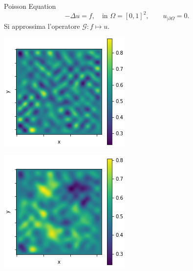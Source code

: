 \documentclass[aspectratio=169]{beamer}
\begin{document}
\begin{frame}[t]{Poisson Equation}
    \[
    -\Delta u = f, \quad \text{in } \Omega = [0, 1]^{2}, \quad\quad u_{| \partial \Omega} = 0.
    \]
    Si approssima l'operatore $\mathcal{G}: f\mapsto u$.
    \begin{center}
        \begin{minipage}{0.24\textwidth}
            \includegraphics[width=\textwidth]{operators/poisson/input.png}
        \end{minipage}
        \hfill
        \begin{minipage}{0.24\textwidth}
            \includegraphics[width=\textwidth]{operators/poisson/output.png}

\end{minipage}
\end{center}
\end{frame}
\end{document}
